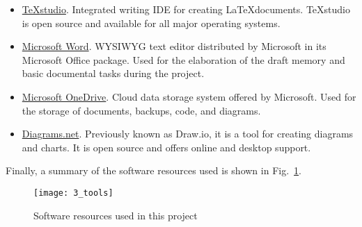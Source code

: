 \begin{itemize}
\item \href{https://www.texstudio.org/}{{\TeX}studio}. Integrated writing IDE for creating \LaTeX documents. {\TeX}studio is open source and available for all major operating systems.\newline

\item \href{https://www.microsoft.com/en-us/microsoft-365/word/}{Microsoft Word}. WYSIWYG text editor distributed by Microsoft in its Microsoft Office package. Used for the elaboration of the draft memory and basic documental tasks during the project.\newline

\item \href{https://www.microsoft.com/en-us/microsoft-365/onedrive/online-cloud-storage/}{Microsoft OneDrive}. Cloud data storage system offered by Microsoft. Used for the storage of documents, backups, code, and diagrams.\newline

\item \href{https://www.diagrams.net/}{Diagrams.net}. Previously known as Draw.io, it is a tool for creating diagrams and charts. It is open source and offers online and desktop support.\newline

\end{itemize}

Finally, a summary of the software resources used is shown in Fig.~\ref{fig:swResources}.

\begin{figure}[htb]
	\centering
	\texttt{[image: 3\_tools]}
	\caption[Software resources]{Software resources used in this project}
	\label{fig:swResources}
\end{figure}


